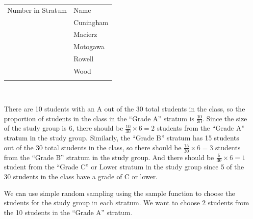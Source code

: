 \documentclass[letterpaper,10pt,english]{jupyterBook}
\begin{document}
\begin{savenotes}
\begin{tabular}[t]{*{3}{}}
\begin{savenotes}\sphinxattablestart
\sphinxthistablewithglobalstyle
\centering
\begin{tabulary}{\linewidth}[t]{TT}
\sphinxtoprule
\sphinxstyletheadfamily 
\sphinxAtStartPar
Number in Stratum
&\sphinxstyletheadfamily 
\sphinxAtStartPar
Name
\\
\sphinxmidrule
\sphinxtableatstartofbodyhook
{}
&
\sphinxAtStartPar
Cuningham
\\
\sphinxhline
{}
&
\sphinxAtStartPar
Macierz
\\
\sphinxhline
{}
&
\sphinxAtStartPar
Motogawa
\\
\sphinxhline
{}
&
\sphinxAtStartPar
Rowell
\\
\sphinxhline
{}
&
\sphinxAtStartPar
Wood
\\
\sphinxbottomrule
\end{tabulary}
\sphinxtableafterendhook\par
\sphinxattableend\end{savenotes}
\\
\sphinxbottomrule
\end{tabular}
\sphinxtableafterendhook\par
\sphinxattableend\end{savenotes}

\sphinxAtStartPar
There are 10 students with an A out of the 30 total students in the class, so the proportion of students in the class in the “Grade A” stratum is \(\frac{10}{30}\). Since the size of the study group is 6, there should be \(\frac{10}{30} \times 6 = 2\) students from the “Grade A” stratum in the study group. Similarly, the “Grade B” stratum has 15 students out of the 30 total students in the class, so there should be \(\frac{15}{30} \times 6 = 3\) students from the “Grade B” stratum in the study group. And there should be \(\frac{5}{30} \times 6 = 1\) student from the “Grade C” or Lower stratum in the study group since 5 of the 30 students in the class have a grade of C or lower.

\sphinxAtStartPar
We can use simple random sampling using the sample function to choose the students for the study group in each stratum. We want to choose 2 students from the 10 students in the “Grade A” stratum.
\end{document}
